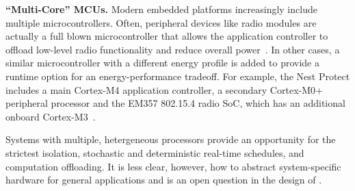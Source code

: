 {\bf ``Multi-Core'' MCUs.}
Modern embedded platforms increasingly include multiple microcontrollers.
Often, peripheral devices like radio modules are actually a full blown
microcontroller that allows the application controller to offload low-level radio
functionality and reduce overall power~\cite{nrf51822,cc2540}. In other cases,
a similar microcontroller with a different energy profile is added to provide
a runtime option for an energy-performance tradeoff.  For example, the Nest
Protect includes a main Cortex-M4 application controller, a secondary
Cortex-M0+ peripheral processor and the EM357 802.15.4 radio SoC, which has an
additional onboard Cortex-M3~\cite{nestprotect-teardown}.



Systems with multiple, hetergeneous processors provide an opportunity for
the strictest isolation, stochastic and deterministic real-time schedules, and
computation offloading. It is less clear, however, how to abstract
system-specific hardware for general applications and is an open question in
the design of \name.


%
%




